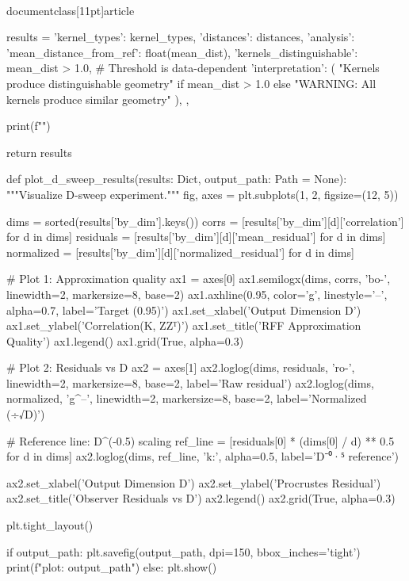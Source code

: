 \\documentclass[11pt]{article}
\begin{document}
\begin{CodeBlock}
    results = {
        'kernel_types': kernel_types,
        'distances': distances,
        'analysis': {
            'mean_distance_from_ref': float(mean_dist),
            'kernels_distinguishable': mean_dist > 1.0,  # Threshold is data-dependent
            'interpretation': (
                "Kernels produce distinguishable geometry"
                if mean_dist > 1.0 else
                "WARNING: All kernels produce similar geometry"
            ),
        },
    }
    
    print(f"")
    
    return results


def plot_d_sweep_results(results: Dict, output_path: Path = None):
    """Visualize D-sweep experiment."""
    fig, axes = plt.subplots(1, 2, figsize=(12, 5))
    
    dims = sorted(results['by_dim'].keys())
    corrs = [results['by_dim'][d]['correlation'] for d in dims]
    residuals = [results['by_dim'][d]['mean_residual'] for d in dims]
    normalized = [results['by_dim'][d]['normalized_residual'] for d in dims]
    
    # Plot 1: Approximation quality
    ax1 = axes[0]
    ax1.semilogx(dims, corrs, 'bo-', linewidth=2, markersize=8, base=2)
    ax1.axhline(0.95, color='g', linestyle='--', alpha=0.7, label='Target (0.95)')
    ax1.set_xlabel('Output Dimension D')
    ax1.set_ylabel('Correlation(K, ZZᵀ)')
    ax1.set_title('RFF Approximation Quality')
    ax1.legend()
    ax1.grid(True, alpha=0.3)
    
    # Plot 2: Residuals vs D
    ax2 = axes[1]
    ax2.loglog(dims, residuals, 'ro-', linewidth=2, markersize=8, base=2, label='Raw residual')
    ax2.loglog(dims, normalized, 'g^--', linewidth=2, markersize=8, base=2, label='Normalized (÷√D)')
    
    # Reference line: D^(-0.5) scaling
    ref_line = [residuals[0] * (dims[0] / d) ** 0.5 for d in dims]
    ax2.loglog(dims, ref_line, 'k:', alpha=0.5, label='D⁻⁰·⁵ reference')
    
    ax2.set_xlabel('Output Dimension D')
    ax2.set_ylabel('Procrustes Residual')
    ax2.set_title('Observer Residuals vs D')
    ax2.legend()
    ax2.grid(True, alpha=0.3)
    
    plt.tight_layout()
    
    if output_path:
        plt.savefig(output_path, dpi=150, bbox_inches='tight')
        print(f"\nSaved plot: {output_path}")
    else:
        plt.show()
    

\end{CodeBlock}
\end{document}
